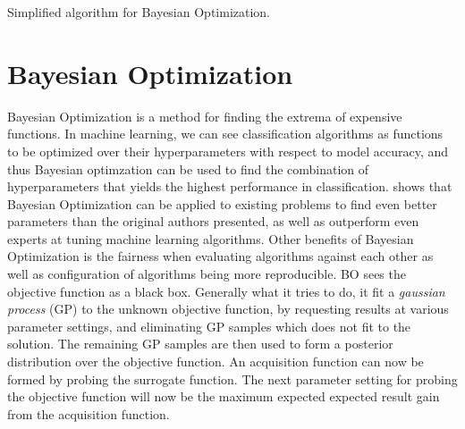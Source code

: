 \begin{algorithm*}
	\caption{Simplified algorithm for Bayesian Optimization.}
	\label{alg:bayesian-optimization}
\end{algorithm*}
\section{Bayesian Optimization}\label{sec:bayesian-optimization}
Bayesian Optimization is a method for finding the extrema of expensive functions. In machine learning, we can see classification algorithms as functions to be optimized over their hyperparameters with respect to model accuracy, and thus Bayesian optimzation can be used to find the combination of hyperparameters that yields the highest performance in classification. \citet{snoek2012practical} shows that Bayesian Optimization can be applied to existing problems to find even better parameters than the original authors presented, as well as outperform even experts at tuning machine learning algorithms. Other benefits of Bayesian Optimization is the fairness when evaluating algorithms against each other as well as configuration of algorithms being more reproducible.
BO sees the objective function as a black box. Generally what it tries to do, it fit a \emph{gaussian process} (GP) to the unknown objective function, by requesting results at various parameter settings, and eliminating GP samples which does not fit to the solution. The remaining GP samples are then used to form a posterior distribution over the objective function. An acquisition function can now be formed by probing the surrogate function. The next parameter setting for probing the objective function will now be the maximum expected expected result gain from the acquisition function.

